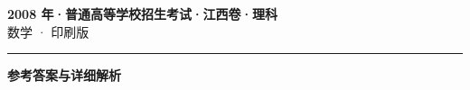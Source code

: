 \documentclass[zihao=5, a4paper]{ctexart}
\begin{document}
\begin{center}
  {\Large\bfseries 2008 年·普通高等学校招生考试·江西卷·理科}\\[4pt]
  {\large 数学 · 印刷版}
\end{center}
\medskip
{}

\par\bigskip\hrule\bigskip
{}
\begin{center}{\large\bfseries 参考答案与详细解析}\end{center}
\smallskip

\end{document}
